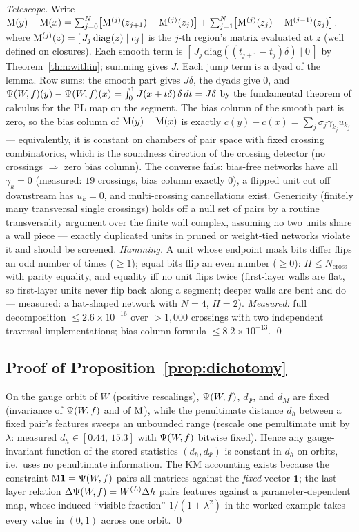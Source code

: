 \emph{Telescope.} Write
$\mathrm{M}(y)-\mathrm{M}(x)=\sum_{j=0}^{N}\bigl[\mathrm{M}^{(j)}(z_{j+1})-\mathrm{M}^{(j)}(z_j)\bigr]
+\sum_{j=1}^{N}\bigl[\mathrm{M}^{(j)}(z_j)-\mathrm{M}^{(j-1)}(z_j)\bigr]$, where
$\mathrm{M}^{(j)}(z)=[\,J_j\,\mathrm{diag}(z)\mid c_j\,]$ is the $j$-th region's
matrix evaluated at $z$ (well defined on closures). Each smooth term is
$[\,J_j\,\mathrm{diag}((t_{j+1}-t_j)\delta)\mid0\,]$ by
Theorem~\ref{thm:within}; summing gives $\bar J$. Each jump term is a dyad of
the lemma. Row sums: the smooth part gives $\bar J\delta$, the dyads give $0$,
and $\Psi(W\!,f)(y)-\Psi(W\!,f)(x)=\int_0^1J(x+t\delta)\,\delta\,dt=\bar J\delta$ by the
fundamental theorem of calculus for the PL map on the segment. The bias
column of the smooth part is zero, so the bias column of $\mathrm{M}(y)-\mathrm{M}(x)$ is
exactly $c(y)-c(x)=\sum_j\sigma_j\gamma_{k_j}u_{k_j}$ --- equivalently, it is
constant on chambers of pair space with fixed crossing combinatorics, which is
the soundness direction of the crossing detector (no crossings $\Rightarrow$
zero bias column). The converse fails: bias-free networks have all
$\gamma_k=0$ (measured: $19$ crossings, bias column exactly $0$), a flipped
unit cut off downstream has $u_k=0$, and multi-crossing cancellations exist.
Genericity (finitely many transversal single crossings) holds off a null set
of pairs by a routine transversality argument over the finite wall complex,
assuming no two units share a wall piece --- exactly duplicated units in
pruned or weight-tied networks violate it and should be screened.
\emph{Hamming.} A unit whose endpoint mask bits differ flips an odd number of
times ($\ge1$); equal bits flip an even number ($\ge0$): $H\le N_{\mathrm{cross}}$
with parity equality, and equality iff no unit flips twice (first-layer walls
are flat, so first-layer units never flip back along a segment; deeper walls
are bent and do --- measured: a hat-shaped network with $N=4$, $H=2$).
\emph{Measured:} full decomposition $\le2.6\times10^{-16}$ over $>1{,}000$
crossings with two independent traversal implementations; bias-column formula
$\le8.2\times10^{-13}$. \qed

\subsection{Proof of Proposition~\ref{prop:dichotomy}}

On the gauge orbit of $W$ (positive rescalings), $\Psi(W\!,f)$, $d_\Psi$, and $d_M$
are fixed (invariance of $\Psi(W\!,f)$ and of $\mathrm{M}$), while the penultimate distance
$d_h$ between a fixed pair's features sweeps an unbounded range (rescale one
penultimate unit by $\lambda$: measured $d_h\in[0.44,\,15.3]$ with $\Psi(W\!,f)$
bitwise fixed). Hence any gauge-invariant function of the stored statistics
$(d_h,d_\Psi)$ is constant in $d_h$ on orbits, i.e.\ uses no penultimate
information. The KM accounting exists because the constraint
$\mathrm{M}\mathbf 1=\Psi(W\!,f)$ pairs all matrices against the \emph{fixed} vector
$\mathbf 1$; the last-layer relation $\Delta\Psi(W\!,f)=W^{(L)}\Delta h$ pairs features
against a parameter-dependent map, whose induced ``visible fraction''
$1/(1+\lambda^2)$ in the worked example takes every value in $(0,1)$ across
one orbit. \qed

